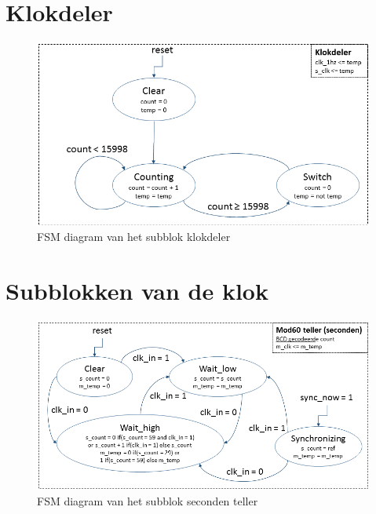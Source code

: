 \section*{Klokdeler}
\begin{figure}[h!]
\begin{center}
\includegraphics[keepaspectratio=true,scale=0.65]{Figuren/DCF77/FSM_klokdeler}
\captionsetup{justification=centering}\caption{FSM diagram van het subblok klokdeler}
\label{fig: klokdeler}
\end{center}
\end{figure}

\section*{Subblokken van de klok}
\begin{figure}[h!]
\begin{center}
\includegraphics[keepaspectratio=true,scale=0.6]{Figuren/DCF77/FSM_seconden}
\captionsetup{justification=centering}\caption{FSM diagram van het subblok seconden teller}
\label{fig: seconden_teller}
\end{center}
\end{figure}

